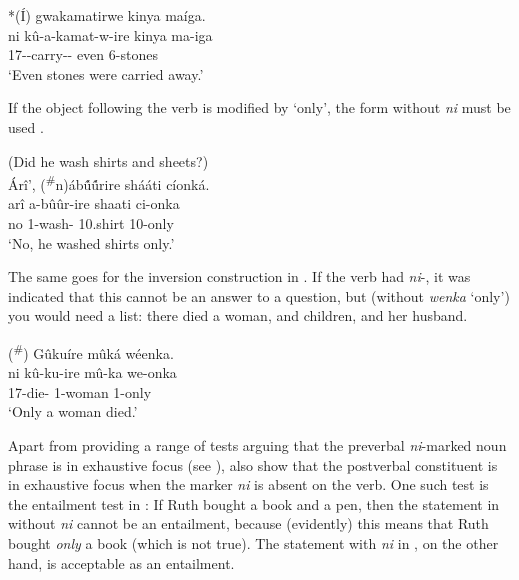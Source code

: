 \documentclass[output=paper]{langscibook}
\begin{document}
\z
\z

\ea
\label{bkm:Ref94543226}
*(Í) gwakamatirwe kinya maíga.\\
\gll
ni  kû-a-kamat-w-ire  kinya  ma-iga\\
\FOC{}  17\SM-\PST{}-carry-\PASS-\PFV{} even  6-stones\\
\glt
‘Even stones were carried away.’

\z


If the object following the verb is modified by ‘only’, the form without \textit{ni} must be used .

\ea
\label{bkm:Ref125200457}
(Did he wash shirts and sheets?)\\
Árî’, (\textsuperscript{\#}n)áb\'{û}\'{û}rire shááti cíonká.\\
\gll
arî  a-bûûr-ire  shaati  ci-onka\\
no 1\SM{}-wash-\PFV{} 10.shirt  10-only\\
\glt
‘No, he washed shirts only.’

\z


The same goes for the inversion construction in . If the verb had \textit{ni}-, it was indicated that this cannot be an answer to a question, but (without \textit{wenka} ‘only’) you would need a list: there died a woman, and children, and her husband.

\ea
\label{bkm:Ref125200487}
(\textsuperscript{\#}) Gûkuíre mûká wéenka.\\
\gll
ni  kû-ku-ire  mû-ka  we-onka\\
\FOC{} 17\SM{}-die-\PFV{} 1-woman  1-only\\
\glt
‘Only a woman died.’

\z


Apart from providing a range of tests arguing that the preverbal \textit{ni}-marked noun phrase is in exhaustive focus (see ), \citet{AbelsMuriungi2008} also show that the postverbal constituent is in exhaustive focus when the marker \textit{ni} is absent on the verb. One such test is the entailment test in : If Ruth bought a book and a pen, then the statement in  without \textit{ni} cannot be an entailment, because (evidently) this means that Ruth bought \textit{only} a book (which is not true). The statement with \textit{ni} in , on the other hand, is acceptable as an entailment.
\end{document}
